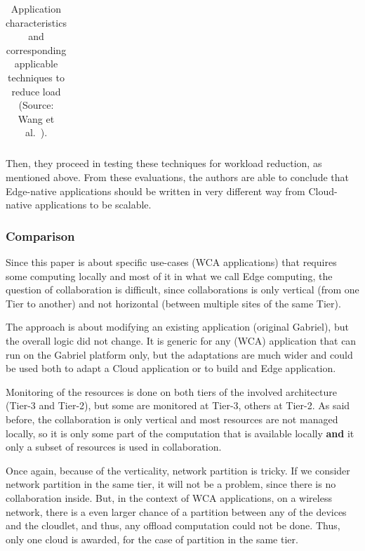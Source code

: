 \begin{table}[h!]
\begin{center}
\begin{scriptsize}
\begin{tabular}{|c|p{4.5cm}|p{5.5cm}|p{4cm}|}
        \hline
      \end{tabular}

      \centering
      \caption{Application characteristics and corresponding
        applicable techniques to reduce load (Source: Wang et
        al.~\cite{WFGI+19}).}
    \label{table:WFGI+19}
  \end{scriptsize}
  \end{center}
\end{table}

Then, they proceed in testing these techniques for workload reduction,
as mentioned above.
%
From these evaluations, the authors are able to conclude that
Edge-native applications should be written in very different way from
Cloud-native applications to be scalable.


\subsubsection*{Comparison}

Since this paper is about specific use-cases (WCA applications) that
requires some computing locally and most of it in what we call Edge
computing, the question of collaboration is difficult, since
collaborations is only vertical (from one Tier to another) and not
horizontal (between multiple sites of the same Tier).
%

The approach is about modifying an existing application (original
Gabriel), but the overall logic did not change.
%
It is generic for any (WCA) application that can run on the Gabriel
platform only, but the adaptations are much wider and could be used
both to adapt a Cloud application or to build and Edge application.

%
Monitoring of the resources is done on both tiers of the involved
architecture (Tier-3 and Tier-2), but some are monitored at Tier-3,
others at Tier-2.
%
As said before, the collaboration is only vertical and most resources
are not managed locally, so it is only some part of the computation
that is available locally \textbf{and} it only a subset of resources
is used in collaboration.

%
Once again, because of the verticality, network partition is tricky.
%
If we consider network partition in the same tier, it will not be a
problem, since there is no collaboration inside.
%
But, in the context of WCA applications, on a wireless network, there
is a even larger chance of a partition between any of the devices and
the cloudlet, and thus, any offload computation could not be
done. Thus, only one cloud is awarded, for the case of partition in
the same tier.

